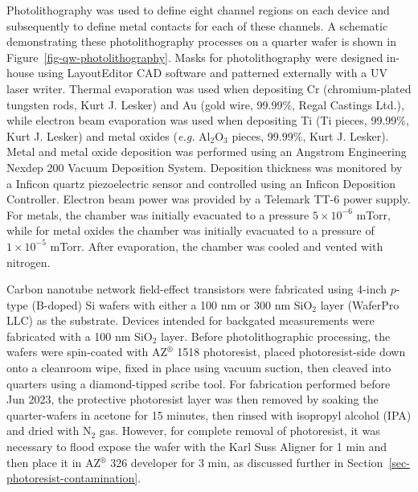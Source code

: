 \documentclass[
  a4paper,
]{scrbook}
\begin{document}
Photolithography was used to define eight channel regions on each device
and subsequently to define metal contacts for each of these channels. A
schematic demonstrating these photolithography processes on a quarter
wafer is shown in Figure~\ref{fig-qw-photolithography}. Masks for
photolithography were designed in-house using LayoutEditor CAD software
and patterned externally with a UV laser writer. Thermal evaporation was
used when depositing Cr (chromium-plated tungsten rods, Kurt J. Lesker)
and Au (gold wire, 99.99\%, Regal Castings Ltd.), while electron beam
evaporation was used when depositing Ti (Ti pieces, 99.99\%, Kurt J.
Lesker) and metal oxides (\emph{e.g.} Al\(_2\)O\(_3\) pieces, 99.99\%,
Kurt J. Lesker). Metal and metal oxide deposition was performed using an
Angstrom Engineering Nexdep 200 Vacuum Deposition System. Deposition
thickness was monitored by a Inficon quartz piezoelectric sensor and
controlled using an Inficon Deposition Controller. Electron beam power
was provided by a Telemark TT-6 power supply. For metals, the chamber
was initially evacuated to a pressure \(5 \times 10^{-6}\) mTorr, while
for metal oxides the chamber was initially evacuated to a pressure of
\(1 \times 10^{-5}\) mTorr. After evaporation, the chamber was cooled
and vented with nitrogen.

Carbon nanotube network field-effect transistors were fabricated using
4-inch \(p\)-type (B-doped) Si wafers with either a 100 nm or 300 nm
SiO\(_2\) layer (WaferPro LLC) as the substrate. Devices intended for
backgated measurements were fabricated with a 100 nm SiO\(_2\) layer.
Before photolithographic processing, the wafers were spin-coated with
AZ\(^\circledR\) 1518 photoresist, placed photoresist-side down onto a
cleanroom wipe, fixed in place using vacuum suction, then cleaved into
quarters using a diamond-tipped scribe tool. For fabrication performed
before Jun 2023, the protective photoresist layer was then removed by
soaking the quarter-wafers in acetone for 15 minutes, then rinsed with
isopropyl alcohol (IPA) and dried with N\(_2\) gas. However, for
complete removal of photoresist, it was necessary to flood expose the
wafer with the Karl Suss Aligner for 1 min and then place it in
AZ\(^\circledR\) 326 developer for 3 min, as discussed further in
Section~\ref{sec-photoresist-contamination}.
\end{document}
